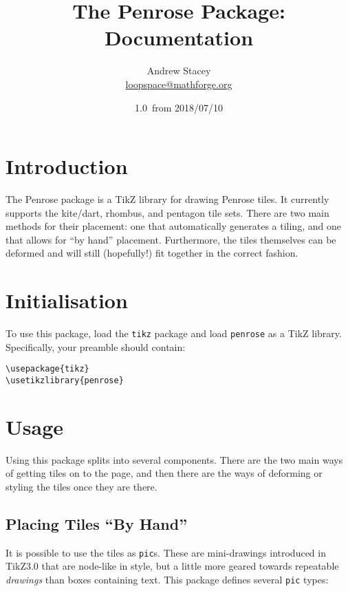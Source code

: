 \documentclass{ltxdoc}
\title{The \textsf{Penrose} Package: Documentation}
\author{Andrew Stacey\texorpdfstring{\\ \url{loopspace@mathforge.org}}{}}
\date{1.0~from 2018/07/10}
\begin{document}
\maketitle

\section{Introduction}

The \textsf{Penrose} package is a TikZ library for drawing Penrose tiles.
It currently supports the kite/dart, rhombus, and pentagon tile sets.
There are two main methods for their placement: one that automatically generates a tiling, and one that allows for ``by hand'' placement.
Furthermore, the tiles themselves can be deformed and will still (hopefully!) fit together in the correct fashion.

\section{Initialisation}

To use this package, load the \Verb+tikz+ package and load \Verb+penrose+ as a TikZ library.
Specifically, your preamble should contain:

\begin{verbatim}
\usepackage{tikz}
\usetikzlibrary{penrose}
\end{verbatim}

\section{Usage}

Using this package splits into several components.
There are the two main ways of getting tiles on to the page, and then there are the ways of deforming or styling the tiles once they are there.

\subsection{Placing Tiles ``By Hand''}

It is possible to use the tiles as \Verb+pic+s.
These are mini-drawings introduced in TikZ3.0 that are node-like in style, but a little more geared towards repeatable \emph{drawings} than boxes containing text.
This package defines several \Verb+pic+ types:

\end{document}
